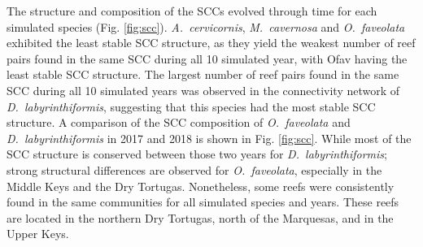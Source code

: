 \documentclass[preprint,12pt,authoryear]{elsarticle}
\begin{document}
The structure and composition of the SCCs evolved through time for each simulated species (Fig. \ref{fig:scc}). \textit{A.~cervicornis}, \textit{M.~cavernosa} and \textit{O.~faveolata} exhibited the least stable SCC structure, as they yield the weakest number of reef pairs found in the same SCC during all 10 simulated year, with Ofav having the least stable SCC structure. The largest number of reef pairs found in the same SCC during all 10 simulated years was observed in the connectivity network of \textit{D.~labyrinthiformis}, suggesting that this species had the most stable SCC structure. A comparison of the SCC composition of \textit{O.~faveolata} and \textit{D.~labyrinthiformis} in 2017 and 2018 is shown in Fig. \ref{fig:scc}. While most of the SCC structure is conserved between those two years for \textit{D.~labyrinthiformis}; strong structural differences are observed for \textit{O.~faveolata}, especially in the Middle Keys and the Dry Tortugas. Nonetheless, some reefs were consistently found in the same communities for all simulated species and years. These reefs are located in the northern Dry Tortugas, north of the Marquesas, and in the Upper Keys.
\end{document}
